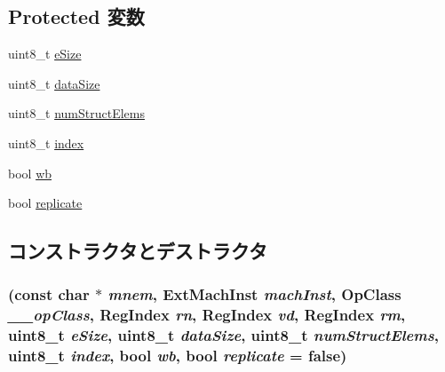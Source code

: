 \subsection*{Protected 変数}
\begin{DoxyCompactItemize}
\item 
uint8\_\-t \hyperlink{classArmISA_1_1VldSingleOp64_aac129ded07ba57383c5e2540f22c94ef}{eSize}
\item 
uint8\_\-t \hyperlink{classArmISA_1_1VldSingleOp64_af13e629a2f79d14821c7b9246ef99e9f}{dataSize}
\item 
uint8\_\-t \hyperlink{classArmISA_1_1VldSingleOp64_afb0be420b537599a5b86558127502040}{numStructElems}
\item 
uint8\_\-t \hyperlink{classArmISA_1_1VldSingleOp64_aae5a12e607d0f782506d9e6ec6179c64}{index}
\item 
bool \hyperlink{classArmISA_1_1VldSingleOp64_a93541ed16711b2c9c53cf093b675d90b}{wb}
\item 
bool \hyperlink{classArmISA_1_1VldSingleOp64_a8f2b56ecc4db4f48e2c08aef78591efc}{replicate}
\end{DoxyCompactItemize}


\subsection{コンストラクタとデストラクタ}
\hypertarget{classArmISA_1_1VldSingleOp64_a61720536a7dbaa8cf1551561689ec645}{
\subsubsection[{VldSingleOp64}]{ (const char $\ast$ {\em mnem}, \/  {\bf ExtMachInst} {\em machInst}, \/  OpClass {\em \_\-\_\-opClass}, \/  {\bf RegIndex} {\em rn}, \/  {\bf RegIndex} {\em vd}, \/  {\bf RegIndex} {\em rm}, \/  uint8\_\-t {\em eSize}, \/  uint8\_\-t {\em dataSize}, \/  uint8\_\-t {\em numStructElems}, \/  uint8\_\-t {\em index}, \/  bool {\em wb}, \/  bool {\em replicate} = {\ttfamily false})}}
\label{classArmISA_1_1VldSingleOp64_a61720536a7dbaa8cf1551561689ec645}



